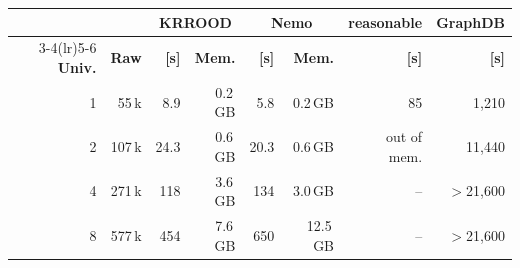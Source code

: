 \begin{tabular}{@{}rrrrrrrr@{}}
\toprule
 & & \multicolumn{2}{c}{\textbf{KRROOD}} & \multicolumn{2}{c}{\textbf{Nemo}} & \textbf{reasonable} & \textbf{GraphDB}\\
\cmidrule(lr){3-4}\cmidrule(lr){5-6}
\textbf{Univ.} & \textbf{Raw} & \textbf{[s]} & \textbf{Mem.} & \textbf{[s]} & \textbf{Mem.} & \textbf{[s]} & \textbf{[s]}\\
\midrule
1 & 55\,k & 8.9 & 0.2\,GB & 5.8 & 0.2\,GB & 85 & 1{,}210\\
2 & 107\,k & 24.3 & 0.6\,GB & 20.3 & 0.6\,GB & out of mem. & 11{,}440\\
4 & 271\,k & 118 & 3.6\,GB & 134 & 3.0\,GB & -- & $>$21{,}600\\
8 & 577\,k & 454 & 7.6\,GB & 650 & 12.5\,GB & -- & $>$21{,}600\\
\bottomrule
\end{tabular}
